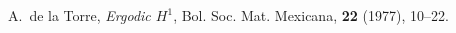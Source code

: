 \begin{thebibliography}{Dillo 83}


 A.\ de la Torre,
{\em Ergodic $H^1$}, 
Bol. Soc. Mat. Mexicana, {\bf 22} (1977), 10--22.




\end{thebibliography}


